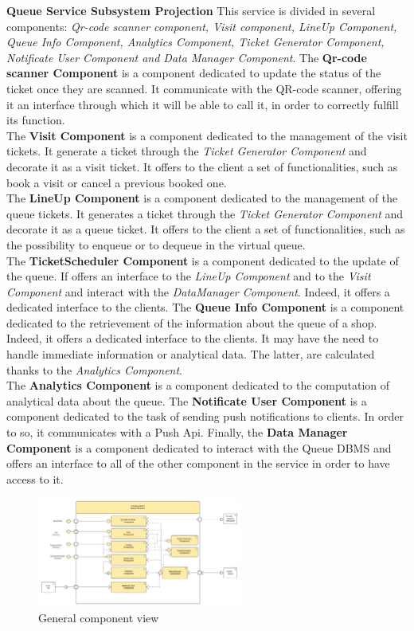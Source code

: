\textbf{Queue Service Subsystem Projection}
This service is divided in several components: \textit{Qr-code scanner component, Visit component, LineUp Component, Queue Info Component, Analytics Component, Ticket Generator Component, Notificate User Component and Data Manager Component}. 
The \textbf{Qr-code scanner Component} is a component dedicated to update the status of the ticket once they are scanned. It communicate with the QR-code scanner, offering it an interface through which it will be able to call it, in order to correctly fulfill its function.\\
The \textbf{Visit Component} is a component dedicated to the management of the visit tickets. It generate a ticket through the \textit{Ticket Generator Component} and decorate it as a visit ticket. It offers to the client a set of functionalities, such as book a visit or cancel a previous booked one.\\
The \textbf{LineUp Component} is a component dedicated to the management of the queue tickets. It generates a ticket through the \textit{Ticket Generator Component} and decorate it as a queue ticket. It offers to the client a set of functionalities, such as the possibility to enqueue or to dequeue in the virtual queue.\\
The \textbf{TicketScheduler Component} is a component dedicated to the update of the queue. If offers an interface to the \textit{LineUp Component} and to the \textit{Visit Component} and interact with the \textit{DataManager Component}.
Indeed, it offers a dedicated interface to the clients.
The \textbf{Queue Info Component} is a component dedicated to the retrievement of the information about the queue of a shop.
Indeed, it offers a dedicated interface to the clients. It may have the need to handle immediate information or analytical data. The latter, are calculated thanks to the \textit{Analytics Component}.\\
The \textbf{Analytics Component} is a component dedicated to the computation of analytical data about the queue.
The \textbf{Notificate User Component} is a component dedicated to the task of sending push notifications to clients. In order to so, it communicates with a Push Api.
Finally, the \textbf{Data Manager Component} is a component dedicated to interact with the Queue DBMS and offers an interface to all of the other component in the service in order to have access to it.

\begin{figure}[h!]
    \centering
    \includegraphics[width=0.6\textwidth]{Images/ComponentViewQueueService (1).png}
    \caption{\label{fig:ComponentViewQueueServices}{General component view}}
\end{figure}


